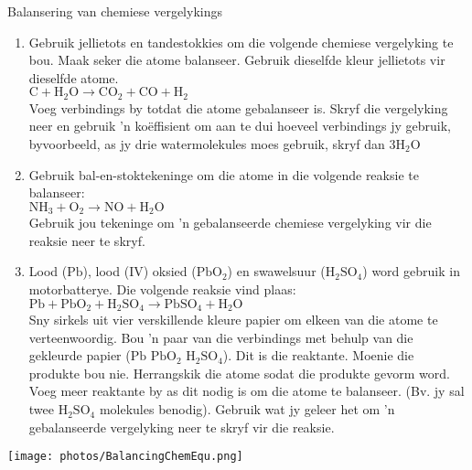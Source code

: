 \begin{activity}{Balansering van chemiese vergelykings}
\begin{enumerate}[noitemsep, label=\textbf{\arabic*}]
\item Gebruik jellietots en tandestokkies om die volgende chemiese vergelyking te bou. Maak seker die atome balanseer. Gebruik dieselfde kleur jellietots vir dieselfde atome.\\
$\text{C} + {\text{H}}_{2}\text{O} \to {\text{CO}}_{2} + {\text{CO}} + \text{H}_{2}$ \\
Voeg verbindings by totdat die atome gebalanseer is. Skryf die vergelyking neer en gebruik 'n ko\"{e}ffisient om aan te dui hoeveel verbindings jy gebruik, byvoorbeeld, as jy drie watermolekules moes gebruik, skryf dan $3{\text{H}}_{2}\text{O}$ 

\item Gebruik bal-en-stoktekeninge om die atome in die volgende reaksie te balanseer:\\
${\text{NH}}_{3} + {\text{O}}_{2} \to {\text{NO}} + \text{H}_{2}\text{O}$ \\
Gebruik jou tekeninge om 'n gebalanseerde chemiese vergelyking vir die reaksie neer te skryf.

\item Lood ($\text{Pb}$), lood (IV) oksied (${\text{PbO}}_{2}$) en swawelsuur  (${\text{H}}_{2}{\text{SO}}_{4}$) word gebruik in motorbatterye. Die volgende reaksie vind plaas:
$\text{Pb} + \text{PbO}_{2} + \text{H}_{2}\text{SO}_{4} \to {\text{PbSO}}_{4} + {\text{H}}_{2}\text{O}$ \\
Sny sirkels uit vier verskillende kleure papier om elkeen van die atome te verteenwoordig. Bou 'n paar van die verbindings met behulp van die gekleurde papier ($\text{Pb}$ $\text{PbO}_{2}$ $\text{H}_{2}\text{SO}_{4}$). Dit is die reaktante. Moenie die produkte bou nie. Herrangskik die atome sodat die produkte gevorm word. Voeg meer reaktante by as dit nodig is om die atome te balanseer. (Bv. jy sal twee $\text{H}_{2}\text{SO}_{4}$ molekules benodig). Gebruik wat jy geleer het om 'n gebalanseerde vergelyking neer te skryf vir die reaksie.
\end{enumerate}
 \begin{center}
\texttt{[image: photos/BalancingChemEqu.png]}\par
 \end{center}
\end{activity}
\par \label{m38726*uid10}
